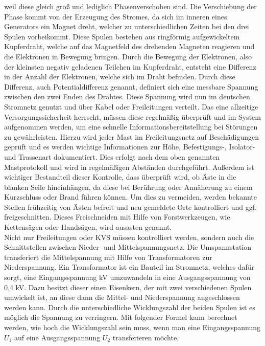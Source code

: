 weil diese gleich groß und lediglich Phasenverschoben sind. Die Verschiebung der Phase kommt von der Erzeugung des Stromes, da sich im inneren eines Generators 
ein Magnet dreht, welcher zu unterschiedlichen Zeiten bei den drei Spulen vorbeikommt. Diese Spulen bestehen aus ringförmig aufgewickeltem Kupferdraht, welche 
auf das Magnetfeld des drehenden Magneten reagieren und die Elektronen in Bewegung bringen. Durch die Bewegung der Elektronen, also der kleinsten negativ 
geladenen Teilchen im Kupferdraht, entsteht eine Differenz in der Anzahl der Elektronen, welche sich im Draht befinden. Durch diese Differenz, auch 
Potentialdifferenz genannt, definiert sich eine messbare Spannung zwischen den zwei Enden des Drahtes. Diese Spannung wird nun im deutschen Stromnetz genutzt 
und über Kabel oder Freileitungen verteilt. Das eine allzeitige Versorgungssicherheit herrscht, müssen diese regelmäßig überprüft und im System aufgenommen 
werden, um eine schnelle Informationsbereitstellung bei Störungen zu gewährleisten. Hierzu wird jeder Mast im Freileitungsnetz auf Beschädigungen geprüft und 
es werden wichtige Informationen zur Höhe, Befestigungs-, Isolator- und Trassenart dokumentiert. Dies erfolgt nach dem oben genannten Mastprotokoll und wird 
in regelmäßigen Abständen durchgeführt. Außerdem ist wichtiger Bestandteil dieser Kontrolle, dass überprüft wird, ob Äste in die blanken Seile hineinhängen, 
da diese bei Berührung oder Annäherung zu einem Kurzschluss oder Brand führen können. Um dies zu vermeiden, werden bekannte Stellen frühzeitig von Ästen 
befreit und neu gemeldete Orte kontrolliert und ggf. freigeschnitten. Dieses Freischneiden mit Hilfe von Forstwerkzeugen, wie Kettensägen oder Handsägen, 
wird ausasten genannt.
\\
Nicht nur Freileitungen oder KVS müssen kontrolliert werden, sondern auch die Schnittstellen zwischen Nieder- und Mittelspannungsnetz. Die Umspannstation 
transferiert die Mittelspannung mit Hilfe von Transformatoren zur Niederspannung. Ein Transformator ist ein Bauteil im Stromnetz, welches dafür sorgt, eine 
Eingangsspannung  kV umzuwandeln in eine Ausgangsspannung von 0,4 kV. Dazu besitzt dieser einen Eisenkern, der mit zwei verschiedenen Spulen 
umwickelt ist, an diese dann die Mittel- und Niederspannung angeschlossen werden kann. Durch die unterschiedliche Wicklungszahl der beiden Spulen ist 
es möglich die Spannung zu verringern. Mit folgender Formel kann berechnet werden, wie hoch die Wicklungszahl sein muss, wenn man \zB eine 
Eingangsspannung $U_1$ auf eine Ausgangsspannung $U_2$ transferieren möchte. 

